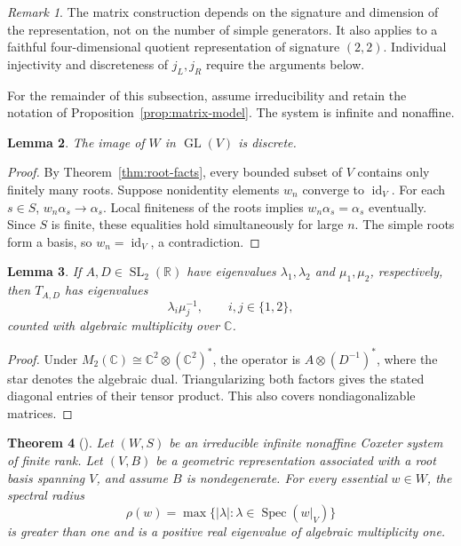 \documentclass[11pt,reqno]{amsart}
\newcommand{\R}{\mathbb{R}}
\newcommand{\C}{\mathbb{C}}
\theoremstyle{plain}
\newtheorem{theorem}{Theorem}[section]
\newtheorem{lemma}[theorem]{Lemma}
\theoremstyle{definition}
\theoremstyle{remark}
\newtheorem{remark}[theorem]{Remark}
\numberwithin{equation}{section}
\begin{document}
\begin{remark}
The matrix construction depends on the signature and dimension of the representation, not on the number of simple generators. It also applies to a faithful four-dimensional quotient representation of signature $(2,2)$. Individual injectivity and discreteness of $j_L,j_R$ require the arguments below.
\end{remark}

For the remainder of this subsection, assume irreducibility and retain the notation of Proposition~\ref{prop:matrix-model}. The system is infinite and nonaffine.

\begin{lemma}\label{lem:discrete-W}
The image of $W$ in $\operatorname{GL}(V)$ is discrete.
\end{lemma}
\begin{proof}
By Theorem~\ref{thm:root-facts}, every bounded subset of $V$ contains only finitely many roots. Suppose nonidentity elements $w_n$ converge to $\operatorname{id}_V$. For each $s\in S$, $w_n\alpha_s\to\alpha_s$. Local finiteness of the roots implies $w_n\alpha_s=\alpha_s$ eventually. Since $S$ is finite, these equalities hold simultaneously for large $n$. The simple roots form a basis, so $w_n=\operatorname{id}_V$, a contradiction.
\end{proof}

\begin{lemma}\label{lem:spectrum}
If $A,D\in\operatorname{SL}_2(\R)$ have eigenvalues $\lambda_1,\lambda_2$ and $\mu_1,\mu_2$, respectively, then $T_{A,D}$ has eigenvalues
\[
\lambda_i\mu_j^{-1},\qquad i,j\in\{1,2\},
\]
counted with algebraic multiplicity over $\C$.
\end{lemma}
\begin{proof}
Under $M_2(\C)\cong\C^2\otimes(\C^2)^*$, the operator is $A\otimes(D^{-1})^*$, where the star denotes the algebraic dual. Triangularizing both factors gives the stated diagonal entries of their tensor product. This also covers nondiagonalizable matrices.
\end{proof}

\begin{theorem}[{\cite[Theorem~6.5.14]{Krammer2009}}]\label{thm:krammer}
Let $(W,S)$ be an irreducible infinite nonaffine Coxeter system of finite rank. Let $(V,B)$ be a geometric representation associated with a root basis spanning $V$, and assume $B$ is nondegenerate. For every essential $w\in W$, the spectral radius
\[
\rho(w)=\max\{|\lambda|:\lambda\in\operatorname{Spec}(w|_V)\}
\]
is greater than one and is a positive real eigenvalue of algebraic multiplicity one.
\end{theorem}
\end{document}
